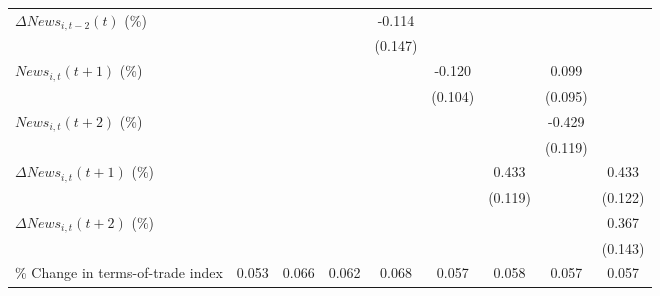 {\begin{tabular}{l*{8}{c}}
\addlinespace
$ \Delta News_{i,t-2}(t)$ (\%)&                     &                     &                     &      -0.114         &                     &                     &                     &                     \\
                    &                     &                     &                     &     (0.147)         &                     &                     &                     &                     \\
\addlinespace
$ News_{i,t}(t+1)$ (\%)&                     &                     &                     &                     &      -0.120         &                     &       0.099         &                     \\
                    &                     &                     &                     &                     &     (0.104)         &                     &     (0.095)         &                     \\
\addlinespace
$ News_{i,t}(t+2)$ (\%)&                     &                     &                     &                     &                     &                     &      -0.429\sym{***}&                     \\
                    &                     &                     &                     &                     &                     &                     &     (0.119)         &                     \\
\addlinespace
$ \Delta News_{i,t}(t+1)$ (\%)&                     &                     &                     &                     &                     &       0.433\sym{***}&                     &       0.433\sym{***}\\
                    &                     &                     &                     &                     &                     &     (0.119)         &                     &     (0.122)         \\
\addlinespace
$ \Delta News_{i,t}(t+2)$ (\%)&                     &                     &                     &                     &                     &                     &                     &       0.367\sym{**} \\
                    &                     &                     &                     &                     &                     &                     &                     &     (0.143)         \\
\addlinespace
\% Change in terms-of-trade index&       0.053         &       0.066\sym{**} &       0.062\sym{*}  &       0.068\sym{*}  &       0.057\sym{*}  &       0.058\sym{**} &       0.057\sym{*}  &       0.057\sym{**} \\

\end{tabular}}
